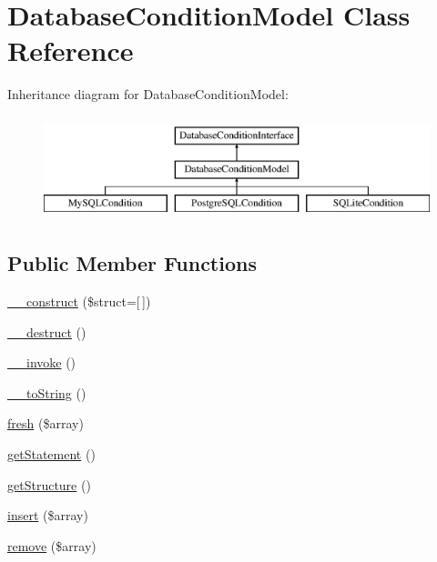 \hypertarget{class_database_condition_model}{}\section{Database\+Condition\+Model Class Reference}
\label{class_database_condition_model}
Inheritance diagram for Database\+Condition\+Model\+:\begin{figure}[H]
\begin{center}
\leavevmode
\includegraphics[height=3.000000cm]{class_database_condition_model}
\end{center}
\end{figure}
\subsection*{Public Member Functions}
\begin{DoxyCompactItemize}
\item 
\hyperlink{class_database_condition_model_aeb576c3b33394f5ab4f37c7e64d44502}{\+\_\+\+\_\+construct} (\$struct=\mbox{[}$\,$\mbox{]})
\item 
\hyperlink{class_database_condition_model_a421831a265621325e1fdd19aace0c758}{\+\_\+\+\_\+destruct} ()
\item 
\hyperlink{class_database_condition_model_a9aac7e1475efe923de4e19cc2511f092}{\+\_\+\+\_\+invoke} ()
\item 
\hyperlink{class_database_condition_model_a7516ca30af0db3cdbf9a7739b48ce91d}{\+\_\+\+\_\+to\+String} ()
\item 
\hyperlink{class_database_condition_model_a069b0ea1d8bcd11e99e5e2e2076841ff}{fresh} (\$array)
\item 
\hyperlink{class_database_condition_model_a71922b66dbbd931e3bd73bd0b8c6bc0f}{get\+Statement} ()
\item 
\hyperlink{class_database_condition_model_ac039a7d66b72b41cbc80f4507d254f68}{get\+Structure} ()
\item 
\hyperlink{class_database_condition_model_a0746ee466ee9178068496aa443ed9189}{insert} (\$array)
\item 
\hyperlink{class_database_condition_model_a170962f6550bf5cefcf4a871dcebc25e}{remove} (\$array)
\end{DoxyCompactItemize}
